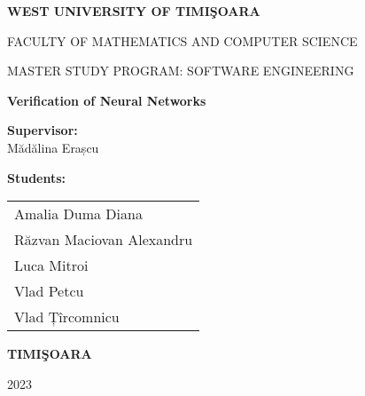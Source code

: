 \documentclass[12pt,a4paper,oneside]{book}
\theoremstyle{definition}
\theoremstyle{remark}
\begin{document}
\sloppy

\thispagestyle{empty}

\newpage
\thispagestyle{empty}
\begin{center}
{\large{\bf WEST UNIVERSITY OF TIMI\c SOARA
		
FACULTY OF MATHEMATICS AND COMPUTER SCIENCE
		
MASTER STUDY PROGRAM:  SOFTWARE ENGINEERING}}

\vspace{200pt}
{\huge {\bf Verification of Neural Networks }}

\vspace{153pt}
\end{center}

\noindent
\begin{minipage}[t]{0.45\textwidth}
    \textbf{Supervisor:} \\
    Mădălina Erașcu \\
\end{minipage}%
\hfill
\begin{minipage}[t]{0.35\textwidth}
    \textbf{Students:} \\
    \begin{tabular}[t]{l}
        Amalia Duma Diana \\
        Răzvan Maciovan Alexandru \\
        Luca Mitroi \\
        Vlad Petcu \\
        Vlad Țîrcomnicu \\
    \end{tabular}
\end{minipage}

 

\vfill
\begin{center}
{\bf TIMI\c SOARA

2023}
\end{center}


\tableofcontents



\end{document}
